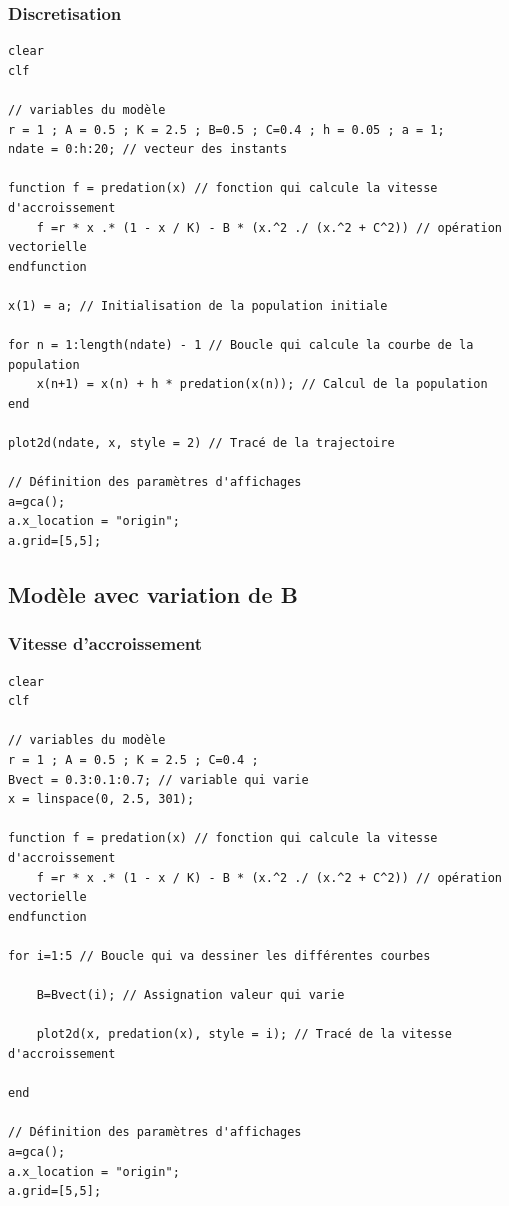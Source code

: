 \documentclass{article}
\begin{document}
\subsubsection{Discretisation}

\begin{verbatim}
clear
clf

// variables du modèle
r = 1 ; A = 0.5 ; K = 2.5 ; B=0.5 ; C=0.4 ; h = 0.05 ; a = 1;
ndate = 0:h:20; // vecteur des instants

function f = predation(x) // fonction qui calcule la vitesse d'accroissement
    f =r * x .* (1 - x / K) - B * (x.^2 ./ (x.^2 + C^2)) // opération vectorielle
endfunction

x(1) = a; // Initialisation de la population initiale

for n = 1:length(ndate) - 1 // Boucle qui calcule la courbe de la population
    x(n+1) = x(n) + h * predation(x(n)); // Calcul de la population
end

plot2d(ndate, x, style = 2) // Tracé de la trajectoire

// Définition des paramètres d'affichages
a=gca();
a.x_location = "origin";
a.grid=[5,5];
\end{verbatim}

\subsection{Modèle avec variation de B}

\subsubsection{Vitesse d'accroissement}

\begin{verbatim}
clear
clf

// variables du modèle
r = 1 ; A = 0.5 ; K = 2.5 ; C=0.4 ;
Bvect = 0.3:0.1:0.7; // variable qui varie
x = linspace(0, 2.5, 301);

function f = predation(x) // fonction qui calcule la vitesse d'accroissement
    f =r * x .* (1 - x / K) - B * (x.^2 ./ (x.^2 + C^2)) // opération vectorielle
endfunction

for i=1:5 // Boucle qui va dessiner les différentes courbes

    B=Bvect(i); // Assignation valeur qui varie

    plot2d(x, predation(x), style = i); // Tracé de la vitesse d'accroissement

end

// Définition des paramètres d'affichages
a=gca();
a.x_location = "origin";
a.grid=[5,5];
\end{verbatim}
\end{document}
